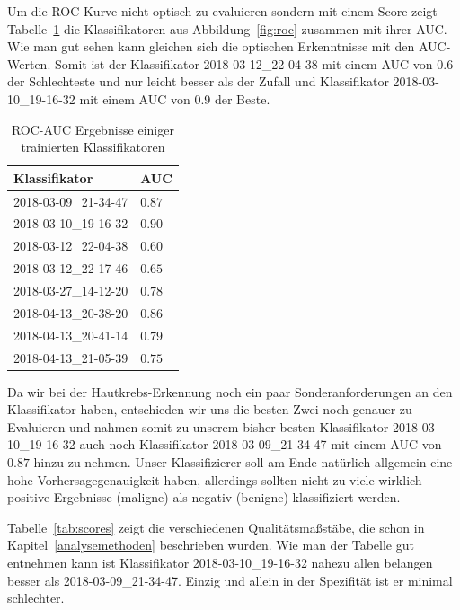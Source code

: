 Um die ROC-Kurve nicht optisch zu evaluieren sondern mit einem Score zeigt Tabelle~\ref{tab:auc} die Klassifikatoren aus Abbildung~\ref{fig:roc} zusammen mit ihrer AUC. Wie man gut sehen kann gleichen sich die optischen Erkenntnisse mit den AUC-Werten. Somit ist der Klassifikator 2018-03-12\_22-04-38 mit einem AUC von 0.6 der Schlechteste und nur leicht besser als der Zufall und Klassifikator 2018-03-10\_19-16-32 mit einem AUC von 0.9 der Beste. 

\begin{table}[htb!]
\begin{center}
\begin{tabular}{ll}
	\toprule
 	Klassifikator  & AUC\\
	\midrule
  	2018-03-09\_21-34-47 &   $0.87$\\
    2018-03-10\_19-16-32 &   $0.90$\\
    2018-03-12\_22-04-38 &   $0.60$\\
    2018-03-12\_22-17-46 &   $0.65$\\
    2018-03-27\_14-12-20 &   $0.78$\\
    2018-04-13\_20-38-20 &   $0.86$\\
    2018-04-13\_20-41-14 &   $0.79$\\
    2018-04-13\_21-05-39 &   $0.75$\\
 \bottomrule
 \end{tabular}
 \end{center}
  \caption{ROC-AUC Ergebnisse einiger trainierten Klassifikatoren}
 \label{tab:auc}
 \end{table}
 
Da wir bei der Hautkrebs-Erkennung noch ein paar Sonderanforderungen an den Klassifikator haben, entschieden wir uns die besten Zwei noch genauer zu Evaluieren und nahmen somit zu unserem bisher besten Klassifikator 2018-03-10\_19-16-32 auch noch Klassifikator 2018-03-09\_21-34-47 mit einem AUC von $0.87$ hinzu zu nehmen. Unser Klassifizierer soll am Ende natürlich allgemein eine hohe Vorhersagegenauigkeit haben, allerdings sollten nicht zu viele wirklich positive Ergebnisse (maligne) als negativ (benigne) klassifiziert werden. 

Tabelle~\ref{tab:scores} zeigt die verschiedenen Qualitätsmaßstäbe,  die schon in Kapitel~\ref{analysemethoden} beschrieben wurden. Wie man der Tabelle gut entnehmen kann ist Klassifikator 2018-03-10\_19-16-32 nahezu allen belangen besser als 2018-03-09\_21-34-47. Einzig und allein in der Spezifität ist er minimal schlechter.

